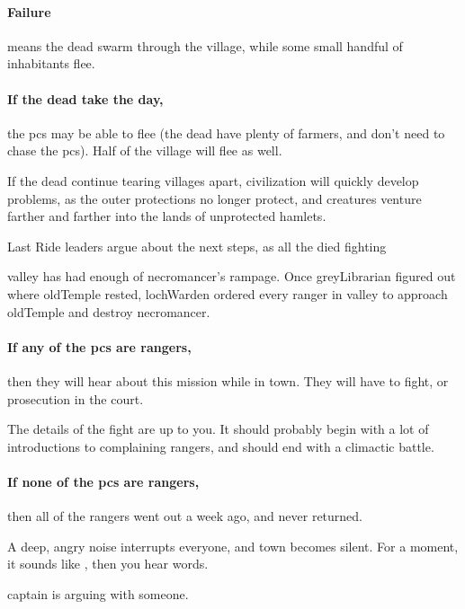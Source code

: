 \paragraph{Failure}
means the dead swarm through the \gls{village}, while some small handful of inhabitants flee.

\paragraph{If the dead take the day,}
the \glspl{pc} may be able to flee (the dead have plenty of farmers, and don't need to chase the \glspl{pc}).
Half of the \gls{village} will flee as well.

If the dead continue tearing \glspl{village} apart, civilization will quickly develop problems, as the outer protections no longer protect, and creatures venture farther and farther into the lands of unprotected hamlets.

{Last Ride}%
{ leaders argue about the next steps, as all the  died fighting }%

\Gls{valley} has had enough of \gls{necromancer}'s rampage.
Once \gls{greyLibrarian} figured out where \gls{oldTemple} rested, \gls{lochWarden} ordered every \gls{ranger} in \gls{valley} to approach \gls{oldTemple} and destroy \gls{necromancer}.

\paragraph{If any of the \glspl{pc} are \glspl{ranger},}
then they will hear about this mission while in \gls{town}.
They will have to fight, or prosecution in the \gls{court}.

The details of the fight are up to you.
It should probably begin with a lot of introductions to complaining \glspl{ranger}, and should end with a climactic battle.

\paragraph{If none of the \glspl{pc} are \glspl{ranger},}
then all of the \glspl{ranger} went out a week ago, and never returned.

\begin{boxtext}
  A deep, angry noise interrupts everyone, and \gls{town} becomes silent.
  For a moment, it sounds like , then you hear words.

  \Gls{captain} is arguing with someone.
\end{boxtext}

